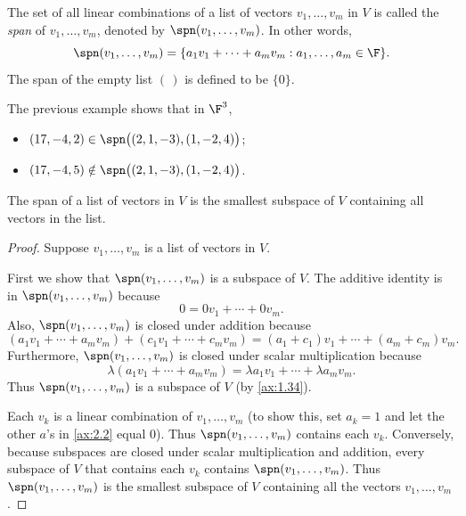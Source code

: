 \begin{definition}[Span]\label{ax:2.4}
The set of all linear combinations of a list of vectors $v_1,\dots,v_m$ in $V$
is called the \emph{span} of $v_1,\dots,v_m$, denoted by
$\spn(v_1,\dots,v_m)$. In other words,
\[ \spn(v_1,\dots,v_m) = \{a_1v_1+\cdots+a_mv_m : a_1,\dots,a_m\in\F\}. \]
The span of the empty list $(\,)$ is defined to be $\{0\}$.
\end{definition}

\begin{example}[Span]\label{ax:2.5}
The previous example shows that in $\F^3$,
\begin{itemize}
\item $(17,-4,2)\in\spn\bigl((2,1,-3),(1,-2,4)\bigr)$;
\item $(17,-4,5)\notin\spn\bigl((2,1,-3),(1,-2,4)\bigr)$.
\end{itemize}
\end{example}

\begin{result}\label{ax:2.6}
The span of a list of vectors in $V$ is the smallest subspace of $V$
containing all vectors in the list.
\end{result}

\begin{proof}
Suppose $v_1,\dots,v_m$ is a list of vectors in $V$.

%
First we show that $\spn(v_1,\dots,v_m)$ is a subspace of $V$. The additive
identity is in $\spn(v_1,\dots,v_m)$ because
\[ 0 = 0v_1+\cdots+0v_m. \]
Also, $\spn(v_1,\dots,v_m)$ is closed under addition because
\[ (a_1v_1+\cdots+a_mv_m)+(c_1v_1+\cdots+c_mv_m)
   = (a_1+c_1)v_1+\cdots+(a_m+c_m)v_m. \]
Furthermore, $\spn(v_1,\dots,v_m)$ is closed under scalar multiplication
because
\[ \lambda(a_1v_1+\cdots+a_mv_m) = \lambda a_1v_1+\cdots+\lambda a_mv_m. \]
Thus $\spn(v_1,\dots,v_m)$ is a subspace of $V$ (by \ref{ax:1.34}).

Each $v_k$ is a linear combination of $v_1,\dots,v_m$ (to show this, set
$a_k=1$ and let the other $a$'s in \ref{ax:2.2} equal $0$). Thus
$\spn(v_1,\dots,v_m)$ contains each $v_k$. Conversely, because subspaces are
closed under scalar multiplication and addition, every subspace of $V$ that
contains each $v_k$ contains $\spn(v_1,\dots,v_m)$. Thus $\spn(v_1,\dots,v_m)$
is the smallest subspace of $V$ containing all the vectors $v_1,\dots,v_m$.
\end{proof}


